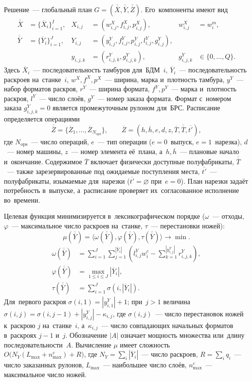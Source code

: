 Решение~--- глобальный план $G=(\overline{\overline{X}},\overline{\overline{Y}},\overline{\overline{Z}})$. Его~компоненты имеют вид
\[
\begin{aligned}
\overline{\overline{X}}&=\{\overline{X}_i\}_{i=1}^{I},&
X_{i,j}&=(w^X_{i,j},f^X_{i,j},p^X_{i,j}),&
w^X_{i,j}&=w_i^m,\\
\overline{\overline{Y}}&=\{\overline{Y}_i\}_{i=1}^{J},&
Y_{i,j}&=(y^Y_{i,j},f^Y_{i,j},p^Y_{i,j},l^Y_{i,j},g^Y_{i,j}),\\
&&y_{i,j,k}&=(r^Y_{i,j,k},g^Y_{i,j,k}),&
g^Y_{i,j,k}&\in\{0,\ldots,Q\}.
\end{aligned}
\]
Здесь $\overline{X}_i$~--- последовательность тамбуров для~БДМ~$i$, $\overline{Y}_i$~--- последовательность раскроев на~станке~$i$, $w^X,f^X,p^X$~--- ширина, марка и~плотность тамбура, $y^Y$~--- набор форматов раскроя, $r^Y$~--- ширина формата, $f^Y,p^Y$~--- марка и~плотность раскроя, $l^Y$~--- число слоёв, $g^Y$~--- номер заказа формата. Формат с~номером заказа $g^Y_{i,j,k}=0$ является промежуточным рулоном для~БРС. Расписание определяется операциями
\[
\overline{\overline{Z}}=\{\overline{Z}_1,\ldots,\overline{Z}_{N_{\mathrm{ops}}}\},
\qquad
\overline{Z}=(h,\overline h,e,d,z,\overline T,
              \overline{\overline T},\overline{t'}),
\]
где $N_{\mathrm{ops}}$~--- число операций, $e$~--- тип операции ($e=0$~выпуск, $e=1$~нарезка), $d$~--- номер машины, $z$~--- номер элемента её~плана, а~$h,\overline h$~--- плановые начало и~окончание. Содержимое $\overline T$ включает физически доступные полуфабрикаты, $\overline{\overline T}$~--- также зарезервированные под ожидаемые поступления места, $\overline{t'}$~--- полуфабрикаты, изымаемые для~нарезки ($\overline{t'}=\varnothing$ при~$e=0$). План нарезки задаёт потребность в~выпуске, а~расписание проверяет их~согласованное исполнение во~времени.

Целевая функция минимизируется в~лексикографическом порядке ($\omega$~--- отходы, $\varphi$~--- максимальное число раскроев на~станке, $\tau$~--- перестановки ножей):
\[
\mu(\overline{\overline{Y}})
=\langle\omega(\overline{\overline{Y}}),
          \varphi(\overline{\overline{Y}}),
          \tau(\overline{\overline{Y}})\rangle\to\min.
\]
\[
\begin{aligned}
\omega(\overline{\overline{Y}})
  &=\sum_{i=1}^{J}\sum_{j=1}^{|\overline{Y}_i|}
    \left(l^Y_{i,j}w_i^c-
    \sum_{k=1}^{|y^Y_{i,j}|}r^Y_{i,j,k}\right),\\
\varphi(\overline{\overline{Y}})
  &=\max_{1\leq i\leq J}|\overline{Y}_i|,\\
\tau(\overline{\overline{Y}})
  &=\sum_{i=1}^{J}\sigma(i,|\overline{Y}_i|).
\end{aligned}
\]
Для~первого раскроя $\sigma(i,1)=|y^Y_{i,1}|+1$; при~$j>1$ величина
$\sigma(i,j)=\sigma(i,j-1)+|y^Y_{i,j}|-\kappa_{i,j}$,
где $\sigma(i,j)$~--- число перестановок ножей к~раскрою $j$ на~станке~$i$, а~$\kappa_{i,j}$~--- число совпадающих начальных форматов в~раскроях $j-1$ и~$j$. Обозначение $|A|$ означает мощность множества или~длину последовательности~$A$. Вычисление $\mu$ имеет сложность $O\bigl(N_Y(L_{\max}+n^c_{\max})+R\bigr)$, где $N_Y=\sum_i|\overline Y_i|$~--- число раскроев, $R=\sum_iq_i$~--- число заказанных рулонов, $L_{\max}$~--- наибольшее число слоёв, $n^c_{\max}$~--- максимальное число ножей.


